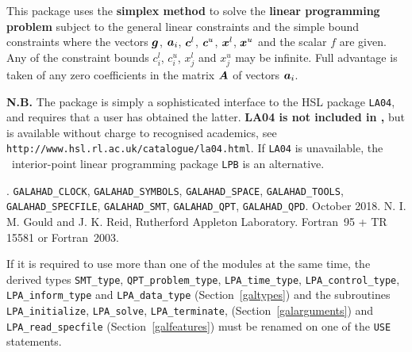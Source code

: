 \documentclass{galahad}
\newcommand{\packagename}{LPA}
\newcommand{\fullpackagename}{\libraryname\_\packagename}
\begin{document}
\galheader


\galsummary
This package uses the {\bf simplex method}
to solve the {\bf linear programming problem}
subject to the general linear constraints
and the simple bound constraints
where the vectors ${\bm{g}}$, ${\bm{a}}_{i}$, ${\bm{c}}^{l}$, ${\bm{c}}^{u}$, ${\bm{x}}^{l}$,
${\bm{x}}^{u}$ and the scalar $f$ are given.
Any of the constraint bounds $c_{i}^{l}$, $c_{i}^{u}$,
$x_{j}^{l}$ and $x_{j}^{u}$ may be infinite.
Full advantage is taken of any zero coefficients in
the matrix ${\bm{A}}$ of vectors ${\bm{a}}_{i}$.

\noindent
{\bf N.B.} The package is simply a sophisticated interface to the HSL package
  {\tt LA04}, and requires that a user has obtained the latter.
  {\bf {LA04} is not included in \galahad,}
  but is available without charge to recognised academics, see
  {\tt http://www.hsl.rl.ac.uk/catalogue/la04.html}. If {\tt LA04}
  is unavailable, the \galahad\ interior-point linear programming
  package {\tt LPB} is an alternative.


\galattributes
\galversions{\tt  \fullpackagename\_single, \fullpackagename\_double}.
\galuses
{\tt GALAHAD\_CLOCK},
{\tt GALAHAD\_SY\-M\-BOLS},
{\tt GALAHAD\-\_SPACE},
{\tt GALAHAD\_TOOLS},
{\tt GALAHAD\_SPECFILE},
{\tt GALAHAD\_SMT},
{\tt GALAHAD\_QPT},
{\tt GALAHAD\_\-QPD}.
\galdate October 2018.
\galorigin N. I. M. Gould and J. K. Reid, Rutherford Appleton Laboratory.
\gallanguage Fortran~95 + TR 15581 or Fortran~2003.


\galhowto



\noindent
If it is required to use more than one of the modules at the same time, 
the derived types
{\tt SMT\_type},
{\tt QPT\_problem\_type},
{\tt \packagename\_time\_type},
{\tt \packagename\_control\_type},
{\tt \packagename\_inform\_type}
and
{\tt \packagename\_data\_type}
(Section~\ref{galtypes})
and the subroutines
{\tt \packagename\_initialize},
{\tt \packagename\_\-solve},
{\tt \packagename\_terminate},
(Section~\ref{galarguments})
and
{\tt \packagename\_read\_specfile}
(Section~\ref{galfeatures})
must be renamed on one of the {\tt USE} statements.
\end{document}
